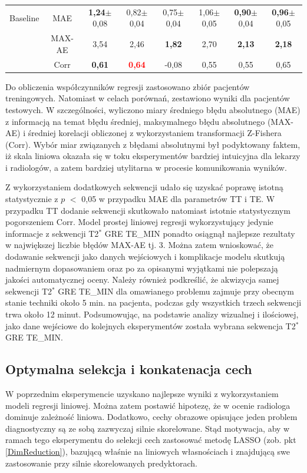 \begin{table}[h!]
\begin{center}
\begin{tabular}{lc||c|c|c|c|c|c}
			Baseline& MAE & \textbf{1,24}$\pm$0,08 & 0,82$\pm$0,04 & 0,75$\pm$0,04 & 1,06$\pm$0,05 & \textbf{0,90}$\pm$0,04 & \textbf{0,96}$\pm$0,05 \\
			&MAX-AE & 3,54 & 2,46 & \textbf{1,82} & 2,70 & \textbf{2,13} & \textbf{2,18}\\
			&Corr   & \textbf{0,61} & \textcolor{red}{\textbf{0,64}} &-0,08 & 0,55 & 0,55 & 0,65\\
			\hline
		\end{tabular}
	\end{center}
	\label{tab:H_testset}
\end{table}
\renewcommand{\arraystretch}{1}

Do obliczenia współczynników regresji zastosowano zbiór pacjentów treningowych. Natomiast w celach porównań, zestawiono wyniki dla pacjentów testowych. \linebreak W szczególności, wyliczono miary średniego błędu absolutnego (MAE) z informacją na temat błędu średniej, maksymalnego błędu absolutnego (MAX-AE) i średniej korelacji obliczonej z wykorzystaniem transformacji Z-Fishera (Corr). Wybór miar związanych z błędami absolutnymi był podyktowany faktem, iż skala liniowa okazała się w toku eksperymentów bardziej intuicyjna dla lekarzy i radiologów, a zatem bardziej utylitarna w procesie komunikowania wyników. 

Z wykorzystaniem dodatkowych sekwencji udało się uzyskać poprawę istotną statystycznie z $p$ $<$ 0,05 w przypadku MAE dla parametrów TT i TE. W przypadku TT dodanie sekwencji skutkowało natomiast istotnie statystycznym pogorszeniem Corr. Model prostej liniowej regresji wykorzystujący jedynie informacje z sekwencji T2$^\ast$ GRE TE\_MIN ponadto osiągnął najlepsze rezultaty w największej liczbie błędów MAX-AE tj. 3. Można zatem wnioskować, że dodawanie sekwencji jako danych wejściowych i komplikacje modelu skutkują nadmiernym dopasowaniem oraz po za opisanymi wyjątkami nie polepszają jakości automatycznej oceny. Należy również podkreślić, że akwizycja samej sekwencji T2$^\ast$ GRE TE\_MIN dla omawianego problemu zajmuje przy obecnym stanie techniki około 5 min. na pacjenta, podczas gdy wszystkich trzech sekwencji trwa około 12 minut. Podsumowując, na podstawie analizy wizualnej i ilościowej, jako dane wejściowe do kolejnych eksperymentów została wybrana sekwencja T2$^\ast$ GRE TE\_MIN. 

\subsection{Optymalna selekcja i konkatenacja cech}
\label{seq:fusion}
W poprzednim eksperymencie uzyskano najlepsze wyniki z wykorzystaniem modeli regresji liniowej. Można zatem postawić hipotezę, że w ocenie radiologa dominuje zależność liniowa. Dodatkowo, cechy obrazowe opisujące jeden problem diagnostyczny są ze sobą zazwyczaj silnie skorelowane. Stąd motywacja, aby w ramach tego eksperymentu do selekcji cech zastosować metodę LASSO (zob. pkt \ref{DimReduction}), bazującą właśnie na liniowych własnościach i znajdującą swe zastosowanie przy silnie skorelowanych predyktorach.  

